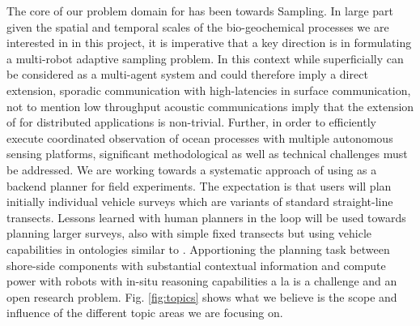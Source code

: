 The core of our problem domain for \can has been towards Sampling. In
large part given the spatial and temporal scales of the
bio-geochemical processes we are interested in in this project, it is
imperative that a key direction is in formulating a multi-robot
adaptive sampling problem. In this context while superficially \rx can
be considered as a multi-agent system and could therefore imply a
direct extension, sporadic communication with high-latencies in
surface communication, not to mention low throughput acoustic
communications imply that the extension of \rx for distributed
applications is non-trivial. Further, in order to efficiently execute
coordinated observation of ocean processes with multiple autonomous
sensing platforms, significant methodological as well as technical
challenges must be addressed. We are working towards a systematic
approach of using \rx as a backend planner for \can field
experiments. The expectation is that \od users will plan initially
individual vehicle surveys which are variants of standard
straight-line transects. Lessons learned with human planners in the
loop will be used towards planning larger surveys, also with simple
fixed transects but using vehicle capabilities in ontologies similar
to \cite{patron09}. Apportioning the planning task between shore-side
components with substantial contextual information and compute power
with robots with in-situ reasoning capabilities a la \rx is a
challenge and an open research problem. Fig. \ref{fig:topics} shows
what we believe is the scope and influence of the different topic
areas we are focusing on.

